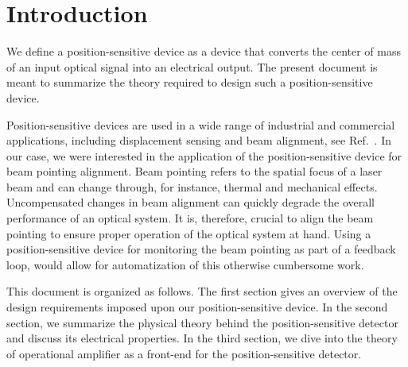 \section{Introduction}

We define a position-sensitive device as a device that converts the center of mass of an input optical signal into an electrical output.
The present document is meant to summarize the theory required to design such a position-sensitive device.

Position-sensitive devices are used in a wide range of industrial and commercial applications, including displacement sensing and beam alignment, see Ref.~\cite[p.~22]{Maekynen00}.
In our case, we were interested in the application of the position-sensitive device for beam pointing alignment.
Beam pointing refers to the spatial focus of a laser beam and can change through, for instance, thermal and mechanical effects.
Uncompensated changes in beam alignment can quickly degrade the overall performance of an optical system.
It is, therefore, crucial to align the beam pointing to ensure proper operation of the optical system at hand.
Using a position-sensitive device for monitoring the beam pointing as part of a feedback loop, would allow for automatization of this otherwise cumbersome work.

This document is organized as follows.
The first section gives an overview of the design requirements imposed upon our position-sensitive device.
In the second section, we summarize the physical theory behind the position-sensitive detector and discuss its electrical properties.
In the third section, we dive into the theory of operational amplifier as a front-end for the position-sensitive detector.